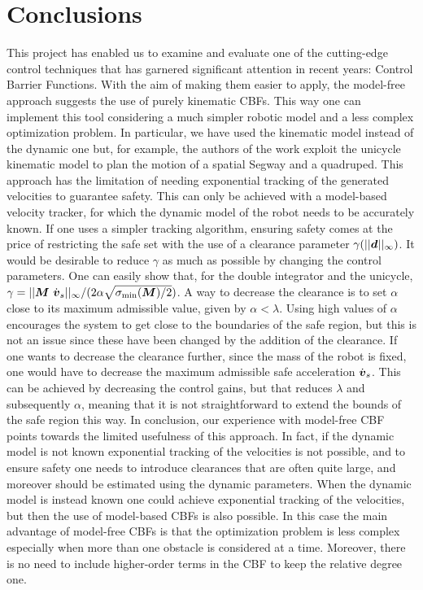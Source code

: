 \section*{Conclusions}
This project has enabled us to examine and evaluate one of the cutting-edge control techniques that has garnered significant attention in recent years: Control Barrier Functions. 
With the aim of making them easier to apply, the model-free approach suggests the use of purely kinematic CBFs. This way one can implement this tool considering a much simpler robotic model and a less complex optimization problem. 
In particular, we have used the kinematic model instead of the dynamic one but, for example, the authors of the work \cite{mfcbf} exploit the unicycle kinematic model to plan the motion of a spatial Segway and a quadruped. This approach has the limitation of needing exponential tracking of the generated velocities to guarantee safety. This can only be achieved with a model-based velocity tracker, for which the dynamic model of the robot needs to be accurately known. If one uses a simpler tracking algorithm, ensuring safety comes at the price of restricting the safe set with the use of a clearance parameter $\gamma(||\boldsymbol{d}||_{\infty})$. 
It would be desirable to reduce $\gamma$ as much as possible by changing the control parameters. One can easily show that, for the double integrator and the unicycle, $\gamma = ||\boldsymbol{M}~\dot{\boldsymbol{v}}_s ||_{\infty} / (2\alpha\sqrt{\sigma_{\min}(\boldsymbol{M})/2})$. 
A way to decrease the clearance is to set $\alpha$ close to its maximum admissible value, given by $\alpha < \lambda$.
Using high values of $\alpha$ encourages the system to get close to the boundaries of the safe region, but this is not an issue since these have been changed by the addition of the clearance. 
If one wants to decrease the clearance further, since the mass of the robot is fixed, one would have to decrease the maximum admissible safe acceleration $\dot{\boldsymbol{v}}_s$. 
This can be achieved by decreasing the control gains, but that reduces $\lambda$ and subsequently $\alpha$, meaning that it is not straightforward to extend the bounds of the safe region this way.
In conclusion, our experience with model-free CBF points towards the limited usefulness of this approach. In fact, if the dynamic model is not known exponential tracking of the velocities is not possible, and to ensure safety one needs to introduce clearances that are often quite large, and moreover should be estimated using the dynamic parameters. 
When the dynamic model is instead known one could achieve exponential tracking of the velocities, but then the use of model-based CBFs is also possible. In this case the main advantage of model-free CBFs is that the optimization problem is less complex especially when more than one obstacle is considered at a time. Moreover, there is no need to include higher-order terms in the CBF to keep the relative degree one.